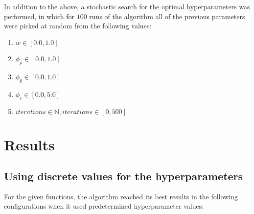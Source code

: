 \documentclass[conference]{IEEEtran}
\begin{document}
In addition to the above, a stochastic search for the optimal hyperparameters was performed, in which for $100$ runs of the algorithm
all of the previous parameters were picked at random from the following values:

\begin{enumerate}
    \item $w \in [0.0, 1.0]$
    \item $\phi_p \in [0.0, 1.0]$
    \item $\phi_g \in [0.0, 1.0]$
    \item $\phi_r \in [0.0, 5.0]$
    \item $iterations \in \mathbb{N}, iterations \in [0, 500]$
\end{enumerate}

\section{Results}

\subsection{Using discrete values for the hyperparameters}
For the given functions, the algorithm reached its best results in the following configurations when it used predetermined
hyperparameter values:

\vspace{1em}
\vspace{1em}
\end{document}
